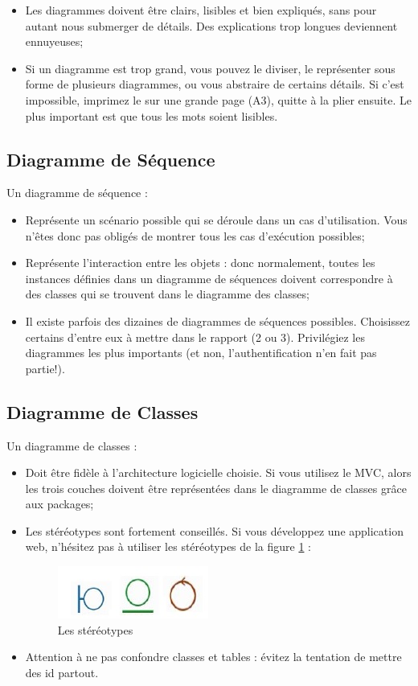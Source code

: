 \begin{spacing}{1.2}
\begin{itemize}
\item Les diagrammes doivent être clairs, lisibles et bien expliqués, sans pour autant
nous submerger de détails. Des explications trop longues deviennent ennuyeuses;
\item Si un diagramme est trop grand, vous pouvez le diviser, le représenter sous
forme de plusieurs diagrammes, ou vous abstraire de certains détails. Si c'est
impossible, imprimez le sur une grande page (A3), quitte à la plier ensuite. Le
plus important est que tous les mots soient lisibles.

\end{itemize}
\subsection{Diagramme de Séquence}
Un diagramme de séquence :
\begin{itemize}
	\item Représente un scénario possible qui se déroule dans un cas d'utilisation. 
	Vous n'êtes donc pas obligés de montrer tous les cas d'exécution possibles;
	\item Représente l'interaction entre les objets : donc normalement, toutes les
	instances définies dans un diagramme de séquences doivent correspondre 
	 à des classes qui se trouvent dans le diagramme des classes;
	 \item Il existe parfois des dizaines de diagrammes de séquences possibles. Choisissez certains d'entre eux à mettre dans le rapport (2 ou 3). Privilégiez les diagrammes les plus importants (et non, l'authentification n'en fait pas partie!).
\end{itemize}
\subsection{Diagramme de Classes}
Un diagramme de classes :
\begin{itemize}
\item Doit être fidèle à l'architecture logicielle choisie. Si vous utilisez le MVC, 
alors les trois couches doivent être représentées dans le diagramme de classes grâce aux packages;
\item Les stéréotypes sont fortement conseillés. Si vous développez une
application web, n'hésitez pas à utiliser les stéréotypes de la figure \ref{fig:fig2} : 
\begin{figure}[!ht]\centering
\includegraphics[scale=0.9]{stereotypes.jpg}
\caption{Les stéréotypes}
\label{fig:fig2}
\end{figure}
\item Attention à ne pas confondre classes et tables : évitez la tentation de
mettre des id partout.


\end{itemize}
\end{spacing}
